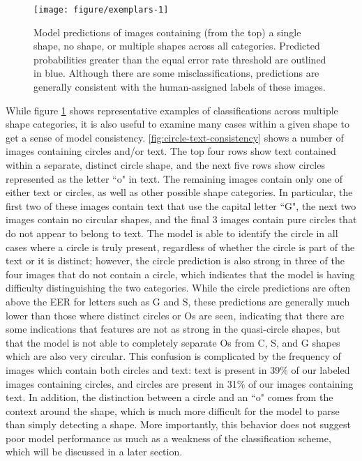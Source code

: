 \documentclass{article}\usepackage[]{graphicx}\usepackage[table]{xcolor}
\newenvironment{knitrout}{}{} %
\begin{document}
\begin{knitrout}
\color{fgcolor}\begin{figure}[p!]

{\centering \texttt{[image: figure/exemplars-1]}

}

\caption[Model predictions of images containing (from the top) a single shape, no shape, or multiple shapes across all categories]{Model predictions of images containing (from the top) a single shape, no shape, or multiple shapes across all categories. Predicted probabilities greater than the equal error rate threshold are outlined in blue. Although there are some misclassifications, predictions are generally consistent with the human-assigned labels of these images.}\label{fig:exemplars}
\end{figure}


\end{knitrout}

While figure \ref{fig:exemplars} shows representative examples of classifications across multiple shape categories, it is also useful to examine many cases within a given shape to get a sense of model consistency. \autoref{fig:circle-text-consistency} shows a number of images containing circles and/or text. The top four rows show text contained within a separate, distinct circle shape, and the next five rows show circles represented as the letter ``o" in text. The remaining images contain only one of either text or circles, as well as other possible shape categories. In particular, the first two of these images contain text that use the capital letter ``G", the next two images contain no circular shapes, and the final 3 images contain pure circles that do not appear to belong to text. The model is able to identify the circle in all cases where a circle is truly present, regardless of whether the circle is part of the text or it is distinct; however, the circle prediction is also strong in three of the four images that do not contain a circle, which indicates that the model is having difficulty distinguishing the two categories. While the circle predictions are often above the EER for letters such as G and S, these predictions are generally much lower than those where distinct circles or Os are seen, indicating that there are some indications that features are not as strong in the quasi-circle shapes, but that the model is not able to completely separate Os from C, S, and G shapes which are also very circular. This confusion is complicated by the frequency of images which contain both circles and text: text is present in 39\% of our labeled images containing circles, and circles are present in 31\% of our images containing text. In addition, the distinction between a circle and an ``o" comes from the context around the shape, which is much more difficult for the model to parse than simply detecting a shape. More importantly, this behavior does not suggest poor model performance as much as a weakness of the classification scheme, which will be discussed in a later section.
\end{document}
